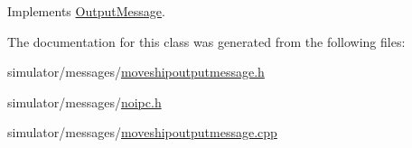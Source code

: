 Implements \mbox{\hyperlink{class_output_message_a42e0a2560b1bf9e58b6626056f87b8c2}{Output\+Message}}.



The documentation for this class was generated from the following files\+:\begin{DoxyCompactItemize}
\item 
simulator/messages/\mbox{\hyperlink{moveshipoutputmessage_8h}{moveshipoutputmessage.\+h}}\item 
simulator/messages/\mbox{\hyperlink{noipc_8h}{noipc.\+h}}\item 
simulator/messages/\mbox{\hyperlink{moveshipoutputmessage_8cpp}{moveshipoutputmessage.\+cpp}}\end{DoxyCompactItemize}
